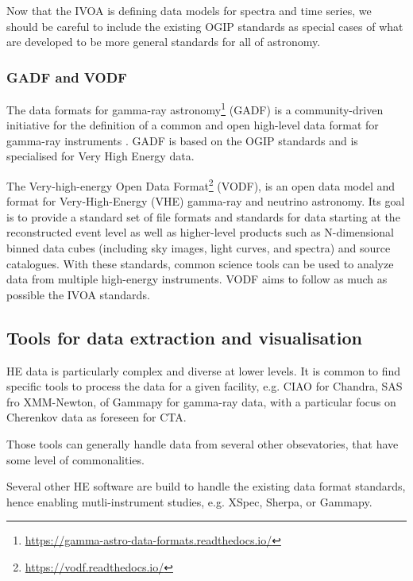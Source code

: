 \documentclass[11pt,a4paper]{ivoa}
\begin{document}
Now that the IVOA is defining data models for spectra and time series, we should be careful to include the existing OGIP standards as special cases of what are developed to be more general standards for all of astronomy.   


\subsubsection{GADF and VODF}
\label{sec:GADF}

The data formats for gamma-ray astronomy\footnote{\url{https://gamma-astro-data-formats.readthedocs.io/}} (GADF) is a community-driven initiative for the definition of a common and open high-level data format for gamma-ray instruments \citep{2017AIPC.1792g0006D,2021-DF}. GADF is based on the OGIP standards and is specialised for Very High Energy data.

The Very-high-energy Open Data Format\footnote{\url{https://vodf.readthedocs.io/}} (VODF), is an open data model and format for Very-High-Energy (VHE) gamma-ray and neutrino astronomy. Its goal is to provide a standard set of file formats and standards for data starting at the reconstructed event level as well as higher-level products such as N-dimensional binned data cubes (including sky images, light curves, and spectra) and source catalogues. With these standards, common science tools can be used to analyze data from multiple high-energy instruments. VODF aims to follow as much as possible the IVOA standards.



\subsection{Tools for data extraction and visualisation}
\label{sec:tools}

HE data is particularly complex and diverse at lower levels. It is common to find specific tools to process the data for a given facility, e.g. CIAO for Chandra, SAS fro XMM-Newton, of Gammapy for gamma-ray data, with a particular focus on Cherenkov data as foreseen for CTA.

Those tools can generally handle data from several other obsevatories, that have some level of commonalities.

Several other HE software are build to handle the existing data format standards, hence enabling mutli-instrument studies, e.g. XSpec, Sherpa, or Gammapy.


\end{document}

